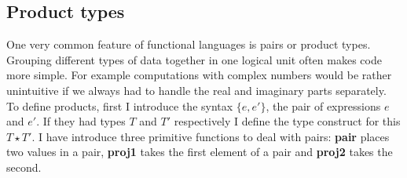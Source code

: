 \documentclass[12pt,twoside,notitlepage]{report}
\begin{document}
\subsection{Product types}
One very common feature of functional languages is pairs or product types. Grouping different types of data together in one logical unit often makes code more simple. For example computations with complex numbers would be rather unintuitive if we always had to handle the real and imaginary parts separately. To define products, first I introduce the syntax $ \{e, e' \} $, the pair of expressions $ e $ and $ e' $. If they had types $ T $ and $ T' $ respectively I define the type construct for this $ T\star T' $. I have introduce three primitive functions to deal with pairs: \textbf{pair} places two values in a pair, \textbf{proj1} takes the first element of a pair and \textbf{proj2} takes the second.
\end{document}
